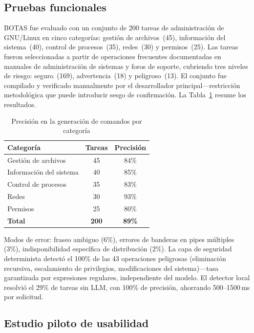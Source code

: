 \documentclass[12pt]{article}
\begin{document}
\subsection{Pruebas funcionales}
\label{subsec:testing}

\noindent
BOTAS fue evaluado con un conjunto de 200 tareas de administración de GNU/Linux
en cinco categorías: gestión de archivos~(45), información del sistema~(40),
control de procesos~(35), redes~(30) y permisos~(25). Las tareas fueron
seleccionadas a partir de operaciones frecuentes documentadas en manuales de
administración de sistemas y foros de soporte, cubriendo tres niveles de riesgo:
seguro~(169), advertencia~(18) y peligroso~(13). El conjunto fue compilado y
verificado manualmente por el desarrollador principal---restricción metodológica
que puede introducir sesgo de confirmación. La Tabla~\ref{tab:accuracy} resume
los resultados.

\begin{table}[h]
\caption{Precisión en la generación de comandos por categoría}
\label{tab:accuracy}
\centering
\begin{tabular}{lcc}
\toprule
\textbf{Categoría} & \textbf{Tareas} & \textbf{Precisión} \\
\midrule
Gestión de archivos    & 45 & 84\% \\
Información del sistema & 40 & 85\% \\
Control de procesos     & 35 & 83\% \\
Redes                   & 30 & 93\% \\
Permisos                & 25 & 80\% \\
\midrule
\textbf{Total}          & \textbf{200} & \textbf{89\%} \\
\bottomrule
\end{tabular}
\end{table}

Modos de error: fraseo ambiguo (6\%), errores de banderas en pipes múltiples
(3\%), indisponibilidad específica de distribución (2\%). La capa de seguridad
determinista detectó el 100\% de las 43 operaciones peligrosas (eliminación
recursiva, escalamiento de privilegios, modificaciones del sistema)---tasa
garantizada por expresiones regulares, independiente del modelo. El detector local
resolvió el 29\% de tareas sin LLM, con 100\% de precisión, ahorrando
500--1500\,ms por solicitud.

\subsection{Estudio piloto de usabilidad}
\label{subsec:usability}
\end{document}
